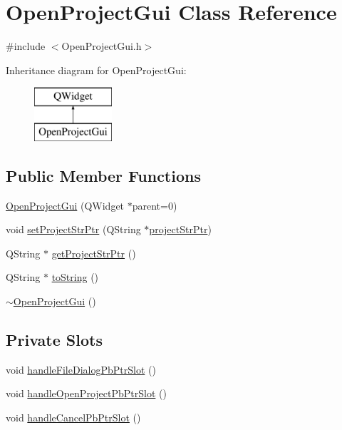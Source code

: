 \hypertarget{class_open_project_gui}{\section{Open\-Project\-Gui Class Reference}
\label{class_open_project_gui}
}


{\ttfamily \#include $<$Open\-Project\-Gui.\-h$>$}

Inheritance diagram for Open\-Project\-Gui\-:\begin{figure}[H]
\begin{center}
\leavevmode
\includegraphics[height=2.000000cm]{class_open_project_gui}
\end{center}
\end{figure}
\subsection*{Public Member Functions}
\begin{DoxyCompactItemize}
\item 
\hyperlink{class_open_project_gui_aaff1da3ebc21a640e891e09cd6c66a7a}{Open\-Project\-Gui} (Q\-Widget $\ast$parent=0)
\item 
void \hyperlink{class_open_project_gui_a7d0b78feb03da8d20d572107006dbb88}{set\-Project\-Str\-Ptr} (Q\-String $\ast$\hyperlink{class_open_project_gui_aadab89933dc3fe2a0bbdb1f1b7e886b7}{project\-Str\-Ptr})
\item 
Q\-String $\ast$ \hyperlink{class_open_project_gui_aa26ced8181a1e103229b08cfa94c19be}{get\-Project\-Str\-Ptr} ()
\item 
Q\-String $\ast$ \hyperlink{class_open_project_gui_a785a51bcb75b19a3094aee54ffdb3734}{to\-String} ()
\item 
\hyperlink{class_open_project_gui_a606b0fe177b53da733484688b9ac810b}{$\sim$\-Open\-Project\-Gui} ()
\end{DoxyCompactItemize}
\subsection*{Private Slots}
\begin{DoxyCompactItemize}
\item 
void \hyperlink{class_open_project_gui_aaacc3341ba7d0bbb9bdebc3b632ef3bc}{handle\-File\-Dialog\-Pb\-Ptr\-Slot} ()
\item 
void \hyperlink{class_open_project_gui_abc7d2b7582449e5552a0ee0cbf54a3a9}{handle\-Open\-Project\-Pb\-Ptr\-Slot} ()
\item 
void \hyperlink{class_open_project_gui_ad5b20cfbb8e0f9d0c0c04dd9c4666b8f}{handle\-Cancel\-Pb\-Ptr\-Slot} ()
\end{DoxyCompactItemize}
